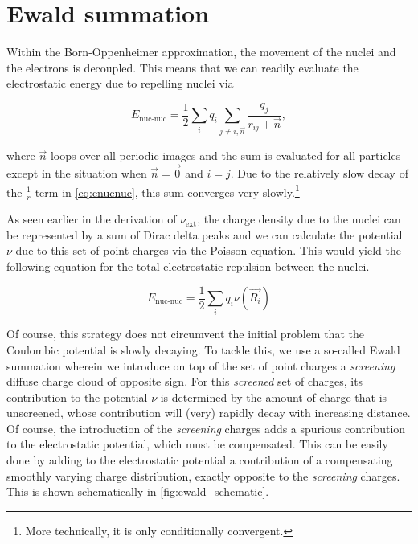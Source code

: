 \section{Ewald summation}
\label{chap:ewald}

Within the Born-Oppenheimer approximation, the movement of the nuclei and the electrons is decoupled.\cite{1927:born} This means that we can readily evaluate the electrostatic energy due to repelling nuclei via

\begin{equation}
    E_{\text{nuc-nuc}} = \frac{1}{2}\sum_{i}q_{i}\sum_{j \neq i,\vec{n}} \frac{q_{j}}{r_{ij} + \vec{n}},
    \label{eq:enucnuc}
\end{equation}

where $\vec{n}$ loops over all periodic images and the sum is evaluated for all particles except in the situation when $\vec{n} = \vec{0}$ and $i = j$. Due to the relatively slow decay of the $\frac{1}{r}$ term in \cref{eq:enucnuc}, this sum converges very slowly.\footnote{More technically, it is only conditionally convergent.}

As seen earlier in the derivation of $\nu_{\text{ext}}$, the charge density due to the nuclei can be represented by a sum of Dirac delta peaks and we can calculate the potential $\nu$ due to this set of point charges via the Poisson equation. This would yield the following equation for the total electrostatic repulsion between the nuclei.

\begin{equation}
    E_{\text{nuc-nuc}} = \frac{1}{2} \sum_{i} q_{i} \nu(\vec{R_{i}})
    \label{eq:enucnuc_realspace}
\end{equation}

Of course, this strategy does not circumvent the initial problem that the Coulombic potential is slowly decaying. To tackle this, we use a so-called Ewald summation wherein we introduce on top of the set of point charges a \textit{screening} diffuse charge cloud of opposite sign.\cite{1921:ewald} For this \textit{screened} set of charges, its contribution to the potential $\nu$ is determined by the amount of charge that is unscreened, whose contribution will (very) rapidly decay with increasing distance. Of course, the introduction of the \textit{screening} charges adds a spurious contribution to the electrostatic potential, which must be compensated. This can be easily done by adding to the electrostatic potential a contribution of a compensating smoothly varying charge distribution, exactly opposite to the \textit{screening} charges. This is shown schematically in \cref{fig:ewald_schematic}.

